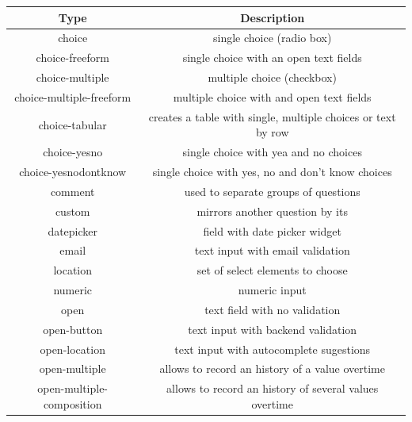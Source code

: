 \begin{longtable}[c]{|c|c|}
\hline
\textbf{Type}             & \textbf{Description}                                        \\ \hline
\endhead
choice                    & single choice (radio box)                                   \\ \hline
choice-freeform           & single choice with an open text fields                      \\ \hline
choice-multiple           & multiple choice (checkbox)                                  \\ \hline
choice-multiple-freeform  & multiple choice with and open text fields                   \\ \hline
choice-tabular            & creates a table with single, multiple choices or text by row      \\ \hline
choice-yesno              & single choice with yea and no choices                       \\ \hline
choice-yesnodontknow      & single choice with yes, no and don't know choices           \\ \hline
comment                   & used to separate groups of questions                        \\ \hline
custom                    & mirrors another question by its                             \\ \hline
datepicker                & field with date picker widget                               \\ \hline
email                     & text input with email validation                            \\ \hline
location                  & set of select elements to choose                            \\ \hline
numeric                   & numeric input                                               \\ \hline
open                      & text field with no validation                               \\ \hline
open-button               & text input with backend validation                          \\ \hline
open-location             & text input with autocomplete sugestions                     \\ \hline
open-multiple             & allows to record an history of a value overtime             \\ \hline
open-multiple-composition & allows to record an history of several values overtime              \\ \hline

\end{longtable}

